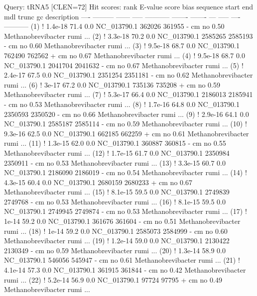 \begin{sreoutput}
Query:       tRNA5  [CLEN=72]
Hit scores:
 rank     E-value  score  bias  sequence      start     end   mdl trunc   gc  description
 ----   --------- ------ -----  ----------- ------- -------   --- ----- ----  -----------
  (1) !   1.4e-18   71.4   0.0  NC_013790.1  362026  361955 -  cm    no 0.50  Methanobrevibacter rumi ...
  (2) !   3.3e-18   70.2   0.0  NC_013790.1 2585265 2585193 -  cm    no 0.60  Methanobrevibacter rumi ...
  (3) !   9.5e-18   68.7   0.0  NC_013790.1  762490  762562 +  cm    no 0.67  Methanobrevibacter rumi ...
  (4) !   9.5e-18   68.7   0.0  NC_013790.1 2041704 2041632 -  cm    no 0.67  Methanobrevibacter rumi ...
  (5) !   2.4e-17   67.5   0.0  NC_013790.1 2351254 2351181 -  cm    no 0.62  Methanobrevibacter rumi ...
  (6) !     3e-17   67.2   0.0  NC_013790.1  735136  735208 +  cm    no 0.59  Methanobrevibacter rumi ...
  (7) !   5.3e-17   66.4   0.0  NC_013790.1 2186013 2185941 -  cm    no 0.53  Methanobrevibacter rumi ...
  (8) !   1.7e-16   64.8   0.0  NC_013790.1 2350593 2350520 -  cm    no 0.66  Methanobrevibacter rumi ...
  (9) !   2.9e-16   64.1   0.0  NC_013790.1 2585187 2585114 -  cm    no 0.59  Methanobrevibacter rumi ...
 (10) !   9.3e-16   62.5   0.0  NC_013790.1  662185  662259 +  cm    no 0.61  Methanobrevibacter rumi ...
 (11) !   1.3e-15   62.0   0.0  NC_013790.1  360887  360815 -  cm    no 0.55  Methanobrevibacter rumi ...
 (12) !   1.7e-15   61.7   0.0  NC_013790.1 2350984 2350911 -  cm    no 0.53  Methanobrevibacter rumi ...
 (13) !   3.3e-15   60.7   0.0  NC_013790.1 2186090 2186019 -  cm    no 0.54  Methanobrevibacter rumi ...
 (14) !   4.3e-15   60.4   0.0  NC_013790.1 2680159 2680233 +  cm    no 0.67  Methanobrevibacter rumi ...
 (15) !   8.1e-15   59.5   0.0  NC_013790.1 2749839 2749768 -  cm    no 0.53  Methanobrevibacter rumi ...
 (16) !   8.1e-15   59.5   0.0  NC_013790.1 2749945 2749874 -  cm    no 0.53  Methanobrevibacter rumi ...
 (17) !     1e-14   59.2   0.0  NC_013790.1  361676  361604 -  cm    no 0.51  Methanobrevibacter rumi ...
 (18) !     1e-14   59.2   0.0  NC_013790.1 2585073 2584999 -  cm    no 0.60  Methanobrevibacter rumi ...
 (19) !   1.2e-14   59.0   0.0  NC_013790.1 2130422 2130349 -  cm    no 0.59  Methanobrevibacter rumi ...
 (20) !   1.3e-14   58.9   0.0  NC_013790.1  546056  545947 -  cm    no 0.61  Methanobrevibacter rumi ...
 (21) !   4.1e-14   57.3   0.0  NC_013790.1  361915  361844 -  cm    no 0.42  Methanobrevibacter rumi ...
 (22) !   5.2e-14   56.9   0.0  NC_013790.1   97724   97795 +  cm    no 0.49  Methanobrevibacter rumi ...

\end{sreoutput}
